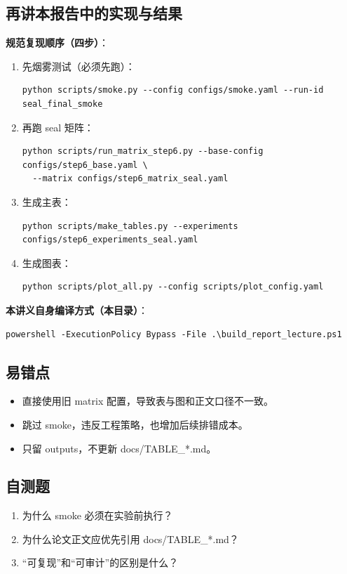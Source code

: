 \documentclass[UTF8,a4paper,12pt]{ctexart}
\begin{document}
\subsection{再讲本报告中的实现与结果}
\textbf{规范复现顺序（四步）}：
\begin{enumerate}
  \item 先烟雾测试（必须先跑）：
\begin{verbatim}
python scripts/smoke.py --config configs/smoke.yaml --run-id seal_final_smoke
\end{verbatim}
  \item 再跑 seal 矩阵：
\begin{verbatim}
python scripts/run_matrix_step6.py --base-config configs/step6_base.yaml \
  --matrix configs/step6_matrix_seal.yaml
\end{verbatim}
  \item 生成主表：
\begin{verbatim}
python scripts/make_tables.py --experiments configs/step6_experiments_seal.yaml
\end{verbatim}
  \item 生成图表：
\begin{verbatim}
python scripts/plot_all.py --config scripts/plot_config.yaml
\end{verbatim}
\end{enumerate}

\textbf{本讲义自身编译方式（本目录）}：
\begin{verbatim}
powershell -ExecutionPolicy Bypass -File .\build_report_lecture.ps1
\end{verbatim}

\subsection{易错点}
\begin{itemize}
  \item 直接使用旧 matrix 配置，导致表与图和正文口径不一致。
  \item 跳过 smoke，违反工程策略，也增加后续排错成本。
  \item 只留 outputs，不更新 docs/TABLE\_*.md。
\end{itemize}

\subsection{自测题}
\begin{enumerate}
  \item 为什么 smoke 必须在实验前执行？
  \item 为什么论文正文应优先引用 docs/TABLE\_*.md？
  \item “可复现”和“可审计”的区别是什么？
\end{enumerate}
\end{document}
